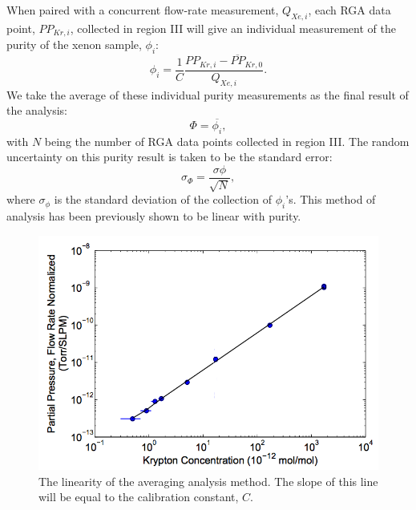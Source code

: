 \documentclass[12pt]{article}
\begin{document}
When paired with a concurrent flow-rate measurement, $Q_{Xe,i}$, each RGA data point, $PP_{Kr,i}$, collected in region III will give an individual measurement of the purity of the xenon sample, $\phi_i$:
\begin{equation}
\phi_i=\frac{1}{C}\frac{PP_{Kr,i}-\overline{PP}_{Kr,0}}{Q_{Xe,i}}.
\label{eq:single_analysis}
\end{equation}
We take the average of these individual purity measurements as the final result of the analysis:
\begin{equation}
\Phi=\overline{\phi_i},
\label{eq:average_analysis}
\end{equation}
with $N$ being the number of RGA data points collected in region III. The random uncertainty on this purity result is taken to be the standard error:
\begin{equation}
\sigma_{\Phi}=\frac{\sigma{\phi}}{\sqrt{N}},
\label{eq:average_error}
\end{equation}
where $\sigma_{\phi}$ is the standard deviation of the collection of $\phi_i$'s. This method of analysis has been previously shown to be linear with purity. \cite{sampling_doug,sampling_dm,sampling_EXO}
\begin{figure}[h!]
  \includegraphics[width=\linewidth]{Figures/Lin_avg_Attila.png}
  \caption{The linearity of the averaging analysis method. The slope of this line will be equal to the calibration constant, $C$.\cite{sampling_dm} }
  \label{fig:linplot_attila}
\end{figure}
\end{document}
